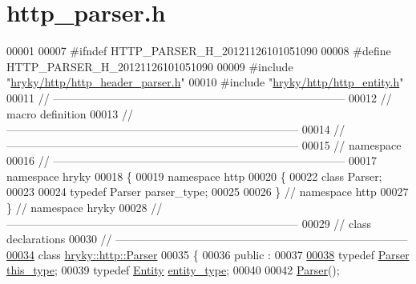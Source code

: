 \hypertarget{http__parser_8h_source}{\section{http\-\_\-parser.\-h}
}

\begin{DoxyCode}
00001 
00007 \textcolor{preprocessor}{#ifndef HTTP\_PARSER\_H\_20121126101051090}
00008 \textcolor{preprocessor}{}\textcolor{preprocessor}{#define HTTP\_PARSER\_H\_20121126101051090}
00009 \textcolor{preprocessor}{}\textcolor{preprocessor}{#include "\hyperlink{http__header__parser_8h}{hryky/http/http_header_parser.h}"}
00010 \textcolor{preprocessor}{#include "\hyperlink{http__entity_8h}{hryky/http/http_entity.h}"}
00011 \textcolor{comment}{//
      ------------------------------------------------------------------------------}
00012 \textcolor{comment}{// macro definition}
00013 \textcolor{comment}{//
      ------------------------------------------------------------------------------}
00014 \textcolor{comment}{//
      ------------------------------------------------------------------------------}
00015 \textcolor{comment}{// namespace}
00016 \textcolor{comment}{//
      ------------------------------------------------------------------------------}
00017 \textcolor{keyword}{namespace }hryky
00018 \{
00019 \textcolor{keyword}{namespace }http
00020 \{
00022     \textcolor{keyword}{class }Parser;
00023 
00024     \textcolor{keyword}{typedef} Parser parser\_type;
00025 
00026 \} \textcolor{comment}{// namespace http}
00027 \} \textcolor{comment}{// namespace hryky}
00028 \textcolor{comment}{//
      ------------------------------------------------------------------------------}
00029 \textcolor{comment}{// class declarations}
00030 \textcolor{comment}{//
      ------------------------------------------------------------------------------}
\hypertarget{http__parser_8h_source_l00034}{}\hyperlink{classhryky_1_1http_1_1_parser}{00034} \textcolor{comment}{}\textcolor{keyword}{class }\hyperlink{classhryky_1_1http_1_1_parser}{hryky::http::Parser}
00035 \{
00036 \textcolor{keyword}{public} :
00037 
\hypertarget{http__parser_8h_source_l00038}{}\hyperlink{classhryky_1_1http_1_1_parser_ad7998597a6ec4d6f9e672e8c4974b117}{00038}     \textcolor{keyword}{typedef} \hyperlink{classhryky_1_1http_1_1_parser}{Parser} \hyperlink{classhryky_1_1http_1_1_parser_ad7998597a6ec4d6f9e672e8c4974b117}{this_type};
00039     \textcolor{keyword}{typedef} \hyperlink{classhryky_1_1http_1_1_entity}{Entity} \hyperlink{classhryky_1_1http_1_1_entity}{entity_type};
00040 
00042     \hyperlink{classhryky_1_1http_1_1_parser_a479bceb82f9242148e35df6062645984}{Parser}();

\end{DoxyCode}

